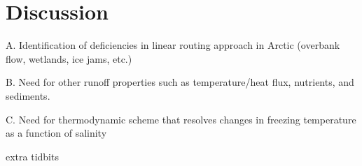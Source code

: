 \section{Discussion}

A.	Identification of deficiencies in linear routing approach in Arctic (overbank flow, wetlands, ice jams, etc.)

B.	Need for other runoff properties such as temperature/heat flux, nutrients, and sediments.

C.	Need for thermodynamic scheme that resolves changes in freezing temperature as a function of salinity

extra tidbits  
